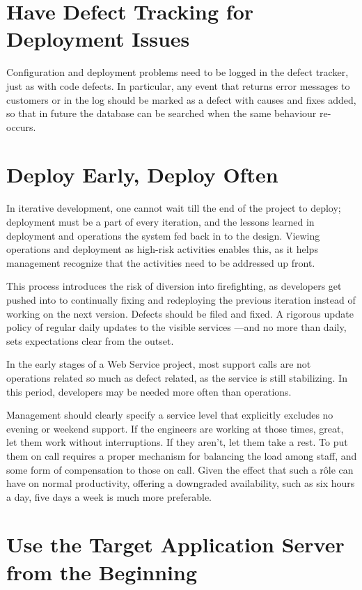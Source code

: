 \documentclass[draft]{report}
\begin{document}
\section{Have Defect Tracking for Deployment Issues}

Configuration and deployment problems need to be logged in the defect
tracker, just as with code defects. In particular, any event that
returns error messages to customers or in the log should be marked as a
defect with causes and fixes added, so that in future the database can
be searched when the same behaviour re-occurs.

\section{Deploy Early, Deploy Often}

In iterative development, one cannot wait till the end of the project to
deploy; deployment must be a part of every iteration, and the lessons
learned in deployment and operations the system fed back in to the
design. Viewing operations and deployment as high-risk activities
enables this, as it helps management recognize that the activities need
to be addressed up front.

This process introduces the risk of diversion into firefighting, as
developers get pushed into to continually fixing and redeploying the
previous iteration instead of working on the next version. Defects
should be filed and fixed. A rigorous update policy of regular daily
updates to the visible services ---and no more than daily, sets
expectations clear from the outset.

In the early stages of a Web Service project, most support calls are not
operations related so much as defect related, as the service is still
stabilizing. In this period, developers may be needed more often than
operations.

Management should clearly specify a service level that explicitly
excludes no evening or weekend support. If the engineers are working at
those times, great, let them work without interruptions. If they aren't,
let them take a rest. To put them on call requires a proper mechanism
for balancing the load among staff, and some form of compensation to
those on call. Given the effect that such a r\^ole can have on normal
productivity, offering a downgraded availability, such as six hours a
day, five days a week is much more preferable.



\section{Use the Target Application Server from the Beginning}
\end{document}
